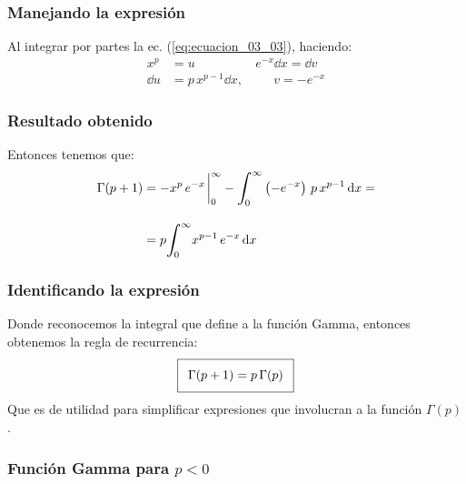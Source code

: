 \documentclass[12pt]{beamer}
\begin{document}
\begin{frame}
\frametitle{Manejando la expresión}
Al integrar por partes la ec. (\ref{eq:ecuacion_03_03}), haciendo:
\pause
\begin{align*}
x^{p} &=  u \hspace{2cm} e^{-x} \dd{x} =  \dd{v} \\[1em]
\dd{u} &= p \, x^{p-1} \dd{x}, \hspace{1cm} v = - e^{-x}
\end{align*}
\end{frame}
\begin{frame}
\frametitle{Resultado obtenido}
Entonces tenemos que:
\pause
\begin{align*}
\Gamma (p+1) &= -x^{p} \, e^{-x} \displaystyle \eval_{0}^{\infty} - \displaystyle \scaleint{6ex}_{\bs 0}^{\infty} \left(-e^{-x} \right) \, p \, x^{p-1} \dd{x} = \\[1em]
&= p \displaystyle \scaleint{6ex}_{\bs 0}^{\infty} x^{p-1} \, e^{-x} \dd{x}
\end{align*}
\end{frame}
\begin{frame}
\frametitle{Identificando la expresión}
Donde reconocemos la integral que define a la función Gamma, entonces obtenemos la regla de recurrencia:  
\pause
\begin{align}\addtolength{\fboxsep}{5pt}\boxed{
\Gamma (p + 1) = p \, \Gamma (p)}
\label{eq:ecuacion_03_04}
\end{align}
Que es de utilidad para simplificar expresiones que involucran a la función $\Gamma (p)$.
\end{frame}

\subsubsection{Función Gamma para \texorpdfstring{$p < 0$}{p < 0}}
\end{document}
